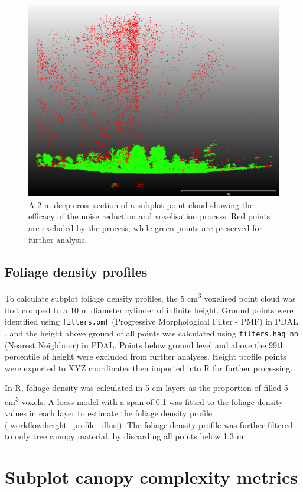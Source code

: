 \begin{refsection}
\begin{figure}
\centering
	\includegraphics[width=0.7\linewidth]{img/noise_vis}
	\caption[Visualisation of noise reduction algorithm]{A 2 m deep cross section of a subplot point cloud showing the efficacy of the noise reduction and voxelisation process. Red points are excluded by the process, while green points are preserved for further analysis.}
	\label{workflow:noise_vis}
\end{figure}

\subsection{Foliage density profiles}
\label{workflow:ssec:profile}

To calculate subplot foliage density profiles, the 5 cm\textsuperscript{3} voxelised point cloud was first cropped to a 10 m diameter cylinder of infinite height. Ground points were identified using \texttt{filters.pmf} (Progressive Morphological Filter - PMF) in PDAL \citep{Zhang2003}, and the height above ground of all points was calculated using \texttt{filters.hag\_nn} (Nearest Neighbour) in PDAL. Points below ground level and above the 99th percentile of height were excluded from further analyses. Height profile points were exported to XYZ coordinates then imported into R for further processing. 

In R, foliage density was calculated in 5 cm layers as the proportion of filled 5 cm\textsuperscript{3} voxels. A loess model with a span of 0.1 was fitted to the foliage density values in each layer to estimate the foliage density profile (\autoref{workflow:height_profile_illus}). The foliage density profile was further filtered to only tree canopy material, by discarding all points below 1.3 m.

\section{Subplot canopy complexity metrics}
\label{workflow:sec:canopy_subplot}


\end{refsection}
